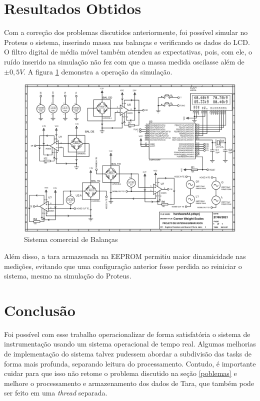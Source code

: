 \documentclass[a4paper, 12pt]{article}
\begin{document}
	
	\section{Resultados Obtidos}
	Com a correção dos problemas discutidos anteriormente, foi possível simular no Proteus o sistema, inserindo massa nas balanças e verificando os dados do LCD. O filtro digital de média móvel também atendeu as expectativas, pois, com ele, o ruído inserido na simulação não fez com que a massa medida oscilasse além de $ \pm 0,5V $. A figura \ref{fig:simulacao} demonstra a operação da simulação.
	
	\begin{figure}[!htb]
		\centering
		\includegraphics[width=.85\linewidth]{simulacao}
		\caption{Sistema comercial de Balanças}
		\label{fig:simulacao}
	\end{figure}

	Além disso, a tara armazenada na EEPROM permitiu maior dinamicidade nas medições, evitando que uma configuração anterior fosse perdida ao reiniciar o sistema, mesmo na simulação do Proteus.  
	
	\section{Conclusão}
	Foi possível com esse trabalho operacionalizar de forma satisfatória o sistema de instrumentação usando um sistema operacional de tempo real. Algumas melhorias de implementação do sistema talvez pudessem abordar a subdivisão das tasks de forma mais profunda, separando leitura do processamento. Contudo, é importante cuidar para que isso não retome o problema discutido na seção \ref{poblemas} e melhore o processamento e armazenamento dos dados de Tara, que também pode ser feito em uma \textit{thread} separada. 
	
	
\end{document}
